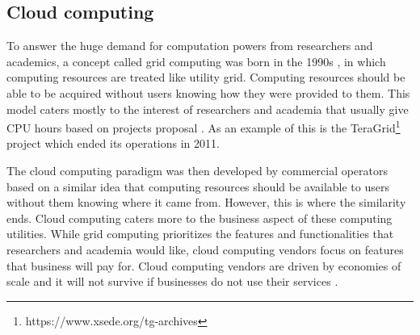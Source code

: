 %



\subsection{Cloud computing}


To answer the huge demand for computation powers from researchers and academics,  a concept called grid computing was born in the 1990s \citep{berman2003grid, foster2003grid}, in which computing resources are treated like utility grid. Computing resources should be able to be acquired without users knowing how they were provided to them. This model caters mostly to the interest of researchers and academia that usually give CPU hours based on projects proposal \citep{foster2008cloud}. As an example of this is the TeraGrid\footnote{https://www.xsede.org/tg-archives} project which ended its operations in 2011.

The cloud computing paradigm was then developed by commercial operators based on a similar idea that computing resources should be available to users without them knowing where it came from. However, this is where the similarity ends. Cloud computing caters more to the business aspect of these computing utilities. While grid computing prioritizes the features and functionalities that researchers and academia would like, cloud computing vendors focus on features that business will pay for. Cloud computing vendors are driven by economies of scale and it will not survive if businesses do not use their services \citep{foster2008cloud}.

